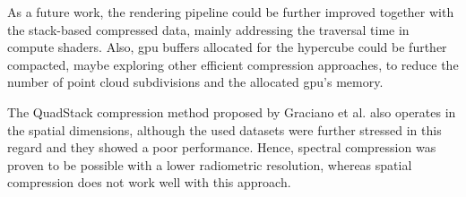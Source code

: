 As a future work, the rendering pipeline could be further improved together with the stack-based compressed data, mainly addressing the traversal time in compute shaders. Also, \acrshort{gpu} buffers allocated for the hypercube could be further compacted, maybe exploring other efficient compression approaches, to reduce the number of point cloud subdivisions and the allocated \acrshort{gpu}'s memory. 

\begin{kaobox}[frametitle=Compression of spatial data from hypercubes with QuadStack]
The QuadStack compression method proposed by Graciano et al. \cite{graciano_quadstack_2021} also operates in the spatial dimensions, although the used datasets were further stressed in this regard and they showed a poor performance. Hence, spectral compression was proven to be possible with a lower radiometric resolution, whereas spatial compression does not work well with this approach.  
\end{kaobox}